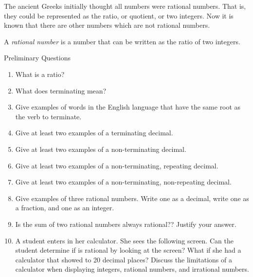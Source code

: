 \documentclass{article}
\begin{document}
The ancient Greeks initially thought all numbers were rational numbers. That is, they could be represented as the ratio, or quotient, or two integers. Now it is known that there are other numbers which are not rational numbers.

\begin{dfn}
  A \emph{rational number} is a number that can be written as the ratio of two integers.
\end{dfn}

Preliminary Questions

\begin{enumerate}
\item What is a ratio?

  \vfill
  
\item What does terminating mean?

  \vfill
  
\item Give examples of words in the English language that have the same root as the verb to terminate.

  \vfill
  
\item Give at least two examples of a terminating decimal.

  \vfill
  
\item Give at least two examples of a non-terminating decimal.

  \vfill
  
\item Give at least two examples of a non-terminating, repeating decimal.

  \vfill

  \clearpage
  
\item Give at least two examples of a non-terminating, non-repeating decimal.

  \vfill
  
\item Give examples of three rational numbers. Write one as a decimal, write one as a fraction, and one as an integer.

  \vfill
  
\item Is the sum of two rational numbers always rational?? Justify your answer.

  \vfill
  
\item A student enters in her calculator. She sees the following screen. Can the student determine if is rational by looking at the screen? What if she had a calculator that showed to 20 decimal places? Discuss the limitations of a calculator when displaying integers, rational numbers, and irrational numbers.


\end{enumerate}
\end{document}
